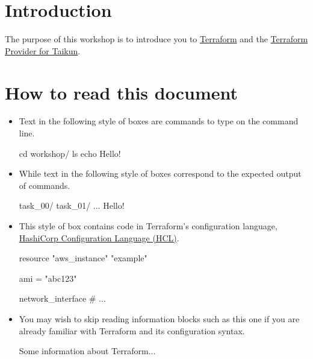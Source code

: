 \section{Introduction}
The purpose of this workshop is to introduce you to
\href{https://www.terraform.io/intro/index.html}{Terraform}
and the \href{https://github.com/itera-io/terraform-provider-taikun}{Terraform Provider for Taikun}.

\section{How to read this document}

\begin{itemize}
  \item Text in the following style of boxes are commands to type on the command line.
\begin{shell}
cd workshop/
ls
echo Hello!
\end{shell}
\item While text in the following style of boxes correspond to the expected output of commands.
\begin{raw}
task_00/
task_01/
...
Hello!
\end{raw}
\item This style of box contains code in Terraform's configuration language,
\href{https://www.terraform.io/docs/language/syntax/configuration.html}{HashiCorp Configuration Language (HCL)}.
\begin{tf}
resource "aws_instance" "example" {
  ami = "abc123"

  network_interface {
    # ...
  }
}
\end{tf}
\item You may wish to skip reading information blocks such as this one if you are already familiar with
Terraform and its configuration syntax.
\begin{tip}
  Some information about Terraform...
\end{tip}
\end{itemize}
